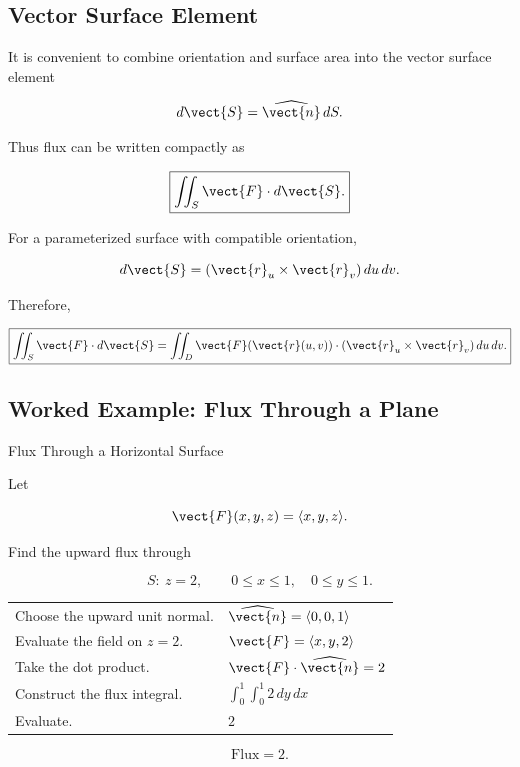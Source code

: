 \subsection{Vector Surface Element}
\label{subsec:vector-surface-element}

It is convenient to combine orientation and surface area into the vector
surface element

\[ d\vect{S}=\widehat{\vect{n}}\,dS. \]

Thus flux can be written compactly as

\[ \boxed{\iint_S\vect{F}\cdot d\vect{S}.} \]

For a parameterized surface with compatible orientation,

\[ d\vect{S}
=
(\vect{r}_u\times\vect{r}_v)\,du\,dv. \]

Therefore,

\[ \boxed{
\iint_S\vect{F}\cdot d\vect{S}
=
\iint_D
\vect{F}(\vect{r}(u,v))
\cdot
(\vect{r}_u\times\vect{r}_v)
\,du\,dv.
} \]

\subsection{Worked Example: Flux Through a Plane}
\label{subsec:worked-flux-plane}

\begin{workedexamplebox}{Flux Through a Horizontal Surface}

Let

\[ \vect{F}(x,y,z)=\langle x,y,z\rangle. \]

Find the upward flux through

\[ S:\ z=2,\qquad0\leq x\leq1,\quad0\leq y\leq1. \]

\begin{tabularx}{\textwidth}{@{}>{\raggedright\arraybackslash}p{}X@{}}
Choose the upward unit normal. &
\(\widehat{\vect{n}}=\langle0,0,1\rangle\)\\
Evaluate the field on \(z=2\). &
\(\vect{F}=\langle x,y,2\rangle\)\\
Take the dot product. &
\(\vect{F}\cdot\widehat{\vect{n}}=2\)\\
Construct the flux integral. &
\(\displaystyle \int_0^1\int_0^1 2\,dy\,dx\)\\
Evaluate. &
\(2\)
\end{tabularx}

\begin{answerbox}
\[ \boxed{\text{Flux}=2.} \]
\end{answerbox}
\end{workedexamplebox}

